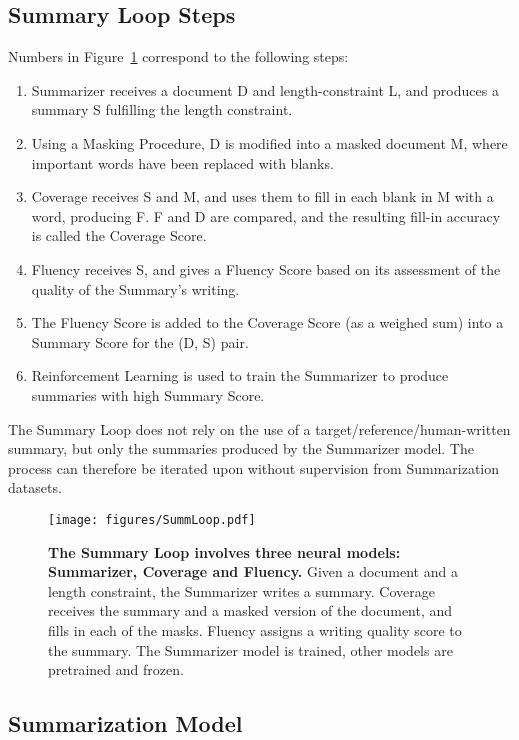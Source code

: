 \documentclass[11pt,a4paper]{article}
\begin{document}
\subsection{Summary Loop Steps}
\label{section:steps}

Numbers in Figure~\ref{fig:loop_rules} correspond to the following steps:
\begin{enumerate}
	\item Summarizer receives a document D and length-constraint L, and produces a summary S fulfilling the length constraint.
	\item Using a Masking Procedure, D is modified into a masked document M, where important words have been replaced with blanks.
	\item Coverage receives S and M, and uses them to fill in each blank in M with a word, producing F. F and D are compared, and the resulting fill-in accuracy is called the Coverage Score.
	\item Fluency receives S, and gives a Fluency Score based on its assessment of the quality of the Summary's writing.
	\item The Fluency Score is added to the Coverage Score (as a weighed sum) into a Summary Score for the (D, S) pair.
	\item Reinforcement Learning is used to train the Summarizer to produce summaries with high Summary Score.
\end{enumerate}

The Summary Loop does not rely on the use of a target/reference/human-written summary, but only the summaries produced by the Summarizer model. The process can therefore be iterated upon without supervision from Summarization datasets.

\begin{figure}[!htbp]
    \centering
    \texttt{[image: figures/SummLoop.pdf]}
    \caption{\textbf{The Summary Loop involves three neural models: Summarizer, Coverage and Fluency.} Given a document and a length constraint, the Summarizer writes a summary. Coverage receives the summary and a masked version of the document, and fills in each of the masks. Fluency assigns a writing quality score to the summary. The Summarizer model is trained, other models are pretrained and frozen.}
    \label{fig:loop_rules}
\end{figure}

\subsection{Summarization Model}
\label{section:summodel}
\end{document}
